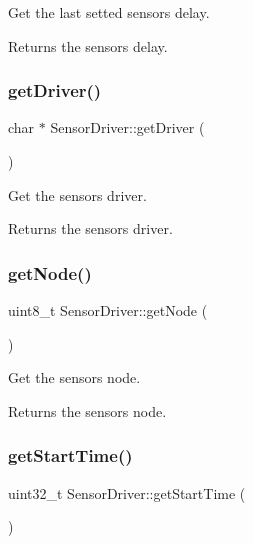 Get the last setted sensor\textquotesingle{}s delay. 

\begin{DoxyReturn}{Returns}
the sensor\textquotesingle{}s delay. 
\end{DoxyReturn}
\mbox{\label{classSensorDriver_a5056f9f058d069b9840a6045c1a652d3}} 
\subsubsection{\texorpdfstring{get\+Driver()}{getDriver()}}
{\footnotesize\ttfamily char $\ast$ Sensor\+Driver\+::get\+Driver (\begin{DoxyParamCaption}{ }\end{DoxyParamCaption})}



Get the sensor\textquotesingle{}s driver. 

\begin{DoxyReturn}{Returns}
the sensor\textquotesingle{}s driver. 
\end{DoxyReturn}
\mbox{\label{classSensorDriver_a30e20150ec52e3ec3a7257978e533618}} 
\subsubsection{\texorpdfstring{get\+Node()}{getNode()}}
{\footnotesize\ttfamily uint8\+\_\+t Sensor\+Driver\+::get\+Node (\begin{DoxyParamCaption}{ }\end{DoxyParamCaption})}



Get the sensor\textquotesingle{}s node. 

\begin{DoxyReturn}{Returns}
the sensor\textquotesingle{}s node. 
\end{DoxyReturn}
\mbox{\label{classSensorDriver_a8636758f202044a24e916d10bf339f10}} 
\subsubsection{\texorpdfstring{get\+Start\+Time()}{getStartTime()}}
{\footnotesize\ttfamily uint32\+\_\+t Sensor\+Driver\+::get\+Start\+Time (\begin{DoxyParamCaption}{ }\end{DoxyParamCaption})}



